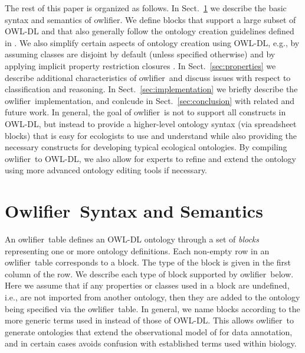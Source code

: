 \documentclass[preprint,number]{elsarticle}
\newcommand{\Owlifier}{\textsf{Owlifier}}
\newcommand{\owlifier}{\textsf{owlifier}}
\newcommand{\secref}[1]{Sect.~\ref{#1}}
\begin{document}
The rest of this paper is organized as follows. In
\secref{sec:owlifier} we describe the basic syntax and semantics of
\owlifier. We define blocks that support a large subset of OWL-DL and
that also generally follow the ontology creation guidelines defined in
\cite{rector04:_owl_pizzas}. We also simplify certain aspects of
ontology creation using OWL-DL, e.g., by assuming classes are disjoint
by default (unless specified otherwise) and by applying implicit
property restriction closures \cite{rector04:_owl_pizzas}. In
\secref{sec:properties} we describe additional characteristics of
\owlifier\ and discuss issues with respect to classification and
reasoning. In \secref{sec:implementation} we briefly describe the
\owlifier\ implementation, and conlcude in \secref{sec:conclusion}
with related and future work. In general, the goal of \owlifier\ is
not to support all constructs in OWL-DL, but instead to provide a
higher-level ontology syntax (via spreadsheet blocks) that is easy for
ecologists to use and understand while also providing the necessary
constructs for developing typical ecological ontologies. By compiling
\owlifier\ to OWL-DL, we also allow for experts to refine and extend
the ontology using more advanced ontology editing tools if necessary.



\section{\Owlifier\ Syntax and Semantics}
\label{sec:owlifier}

An \owlifier\ table defines an OWL-DL
\cite{smith04:_owl_web_ontol_languag_guide} ontology through a set of
\emph{blocks} representing one or more ontology definitions.  Each
non-empty row in an \owlifier\ table corresponds to a block. The type
of the block is given in the first column of the row. We describe each
type of block supported by \owlifier\ below. Here we assume that if
any properties or classes used in a block are undefined, i.e., are not
imported from another ontology, then they are added to the ontology
being specified via the \owlifier\ table. In general, we name blocks
according to the more generic terms used in
\cite{bowers08:_concep_model_framew_for_expres,madina07:_ontol_for_descr_and_synth}
instead of those of OWL-DL. This allows \owlifier\ to generate
ontologies that extend the observational model of
\cite{madina07:_ontol_for_descr_and_synth} for data annotation, and in
certain cases avoids confusion with established terms used within
biology.
\end{document}

